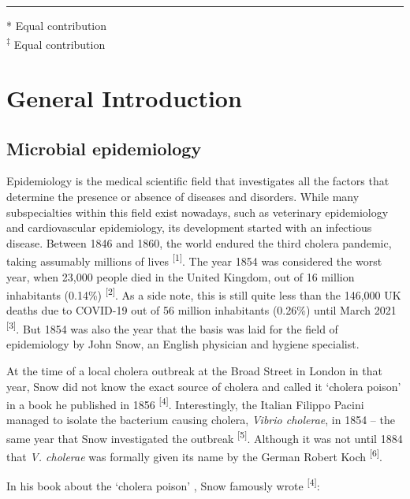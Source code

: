 \documentclass[
]{book}
\begin{document}
\begin{center}\rule{0.5\linewidth}{0.5pt}\end{center}

* Equal contribution\\
\textsuperscript{‡} Equal contribution

\hypertarget{ch01-introduction}{%
\chapter{General Introduction}\label{ch01-introduction}}

\hypertarget{microbial-epidemiology}{%
\section{Microbial epidemiology}\label{microbial-epidemiology}}

Epidemiology is the medical scientific field that investigates all the factors that determine the presence or absence of diseases and disorders. While many subspecialties within this field exist nowadays, such as veterinary epidemiology and cardiovascular epidemiology, its development started with an infectious disease. Between 1846 and 1860, the world endured the third cholera pandemic, taking assumably millions of lives \textsuperscript{{[}1{]}}. The year 1854 was considered the worst year, when 23,000 people died in the United Kingdom, out of 16 million inhabitants (0.14\%) \textsuperscript{{[}2{]}}. As a side note, this is still quite less than the 146,000 UK deaths due to COVID-19 out of 56 million inhabitants (0.26\%) until March 2021 \textsuperscript{{[}3{]}}. But 1854 was also the year that the basis was laid for the field of epidemiology by John Snow, an English physician and hygiene specialist.

At the time of a local cholera outbreak at the Broad Street in London in that year, Snow did not know the exact source of cholera and called it `cholera poison' in a book he published in 1856 \textsuperscript{{[}4{]}}. Interestingly, the Italian Filippo Pacini managed to isolate the bacterium causing cholera, \emph{Vibrio cholerae}, in 1854 -- the same year that Snow investigated the outbreak \textsuperscript{{[}5{]}}. Although it was not until 1884 that \emph{V. cholerae} was formally given its name by the German Robert Koch \textsuperscript{{[}6{]}}.

In his book about the `cholera poison' , Snow famously wrote \textsuperscript{{[}4{]}}:
\end{document}
